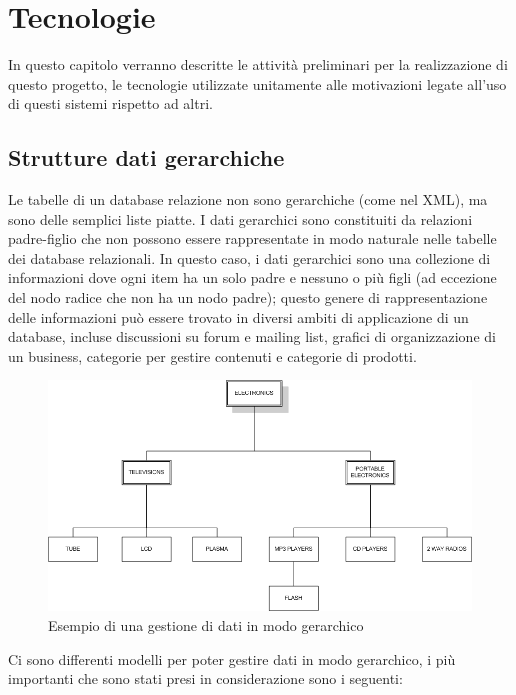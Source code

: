 \chapter{Tecnologie}
In questo capitolo verranno descritte le attività preliminari per la realizzazione di questo progetto, le tecnologie utilizzate
unitamente alle motivazioni legate all'uso di questi sistemi rispetto ad altri.

\section{Strutture dati gerarchiche}
Le tabelle di un database relazione non sono gerarchiche (come nel XML), ma sono delle semplici liste piatte. I dati gerarchici sono 
constituiti da relazioni padre-figlio che non possono essere rappresentate in modo naturale nelle tabelle dei database relazionali.
In questo caso, i dati gerarchici sono una collezione di informazioni dove ogni item ha un solo padre e nessuno o più figli
(ad eccezione del nodo radice che non ha un nodo padre); questo genere di rappresentazione delle informazioni può essere trovato in 
diversi ambiti di applicazione di un database, incluse discussioni su forum e mailing list, grafici di organizzazione di un business, 
categorie per gestire contenuti e categorie di prodotti. 

\begin{figure}[H]
	\label{fig:Hde}
	\includegraphics[scale=0.45]{images/Hierarchical_Data_ex.PNG}
	\caption{Esempio di una gestione di dati in modo gerarchico}
\end{figure}

Ci sono differenti modelli per poter gestire dati in modo gerarchico, i più importanti che sono stati presi in considerazione sono i 
seguenti:

\newpage

